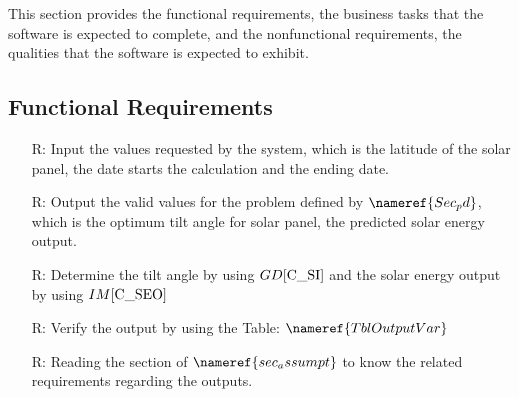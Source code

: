 \documentclass[12pt]{article}
\newcommand{\dref}[1]{GD\ref{#1}}
\newcommand{\iref}[1]{IM\ref{#1}}
\newcounter{reqnum} %
\begin{document}
This section provides the functional requirements, the business tasks that the
software is expected to complete, and the nonfunctional requirements, the
qualities that the software is expected to exhibit.



\subsection{Functional Requirements}


\noindent \begin{itemize}

\item[R\refstepcounter{reqnum}\thereqnum \label{R_Inputs}:] Input the values 
requested by the system, which is the latitude of the solar panel, the date starts the calculation and the ending date.

\item[R\refstepcounter{reqnum}\thereqnum \label{R_OutputInputs}:] Output the 
valid values for the problem defined by $\nameref{Sec_pd} $, which is the optimum 
tilt angle for solar panel, the predicted solar energy output.

\item[R\refstepcounter{reqnum}\thereqnum \label{R_Calculate}:] Determine the tilt angle 
by using $\dref{C_SI}$ and the solar energy output by using $\iref{C_SEO}$

\item[R\refstepcounter{reqnum}\thereqnum \label{R_VerifyOutput}:] Verify the output 
by using the Table: $\nameref{TblOutputVar}$

\item[R\refstepcounter{reqnum}\thereqnum \label{R_Output}:]Reading the section of 
$\nameref{sec_assumpt}$ to know the related requirements regarding the outputs.

\end{itemize}
\end{document}
